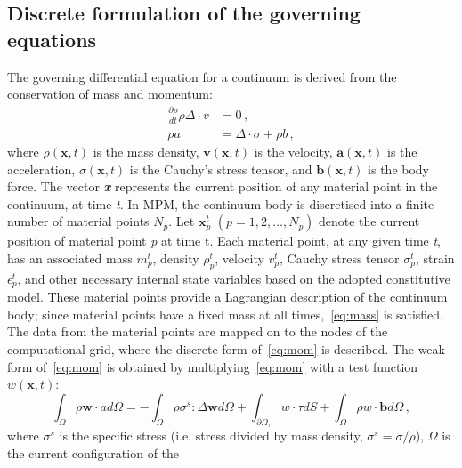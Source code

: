 \subsection{Discrete formulation of the governing equations}
The governing differential equation for a continuum is derived from the 
conservation of mass and momentum:
\begin{align}
\label{eq:mass}
\frac{\partial \rho}{dt}\rho \Delta \cdot \mathbf{\mathit{v}} & = 0 \,, \\   
 \label{eq:mom}
 \rho a & = \Delta \cdot \sigma + \rho \mathbf{\mathit{b}} \,,
\end{align}
where $\rho (\mathbf{x},t)$ is the mass density, $\mathit{\mathbf{v}} 
(\mathbf{x},t)$ is the velocity,  $\mathit{\mathbf{a}} (\mathbf{x},t)$ is the 
acceleration,  $\sigma (\mathbf{x},t)$ is the Cauchy's stress tensor, and  
$\mathit{\mathbf{b}} (\mathbf{x},t)$ is the body force. The vector 
\textbf{\textit{x}} represents the current position of any material point in 
the continuum, at time \textit{t}. In MPM, the continuum body is discretised 
into a finite number of material points $\mathit{N}_{p}$. Let 
$\mathit{\mathbf{x}}_{p}^{t}$ $(\mathit{p}=1,2,\dots,\mathit{N}_{p})$ denote 
the current position of material point \textit{p} at time t.
Each material point, at any given time \textit{t}, has an associated mass 
$\mathit{m}_{p}^{t}$, density $\rho_{p}^{t}$, velocity 
$\mathbf{\mathit{v}}_{p}^{t}$, Cauchy stress tensor $\sigma_{p}^{t}$, strain 
$\epsilon_{p}^{t}$, and other necessary internal state variables based on the 
adopted constitutive model. These material points provide a Lagrangian 
description of the continuum body; since material points have a fixed mass at 
all times,~\cref{eq:mass} is satisfied. The data from the material points 
are mapped on to the nodes of the computational grid, where the discrete form 
of~\cref{eq:mom} is described. The weak form of~\cref{eq:mom} is 
obtained 
by multiplying~\cref{eq:mom} with a test function 
$\mathbf{\mathit{w}}(\mathbf{x},t)$:
\begin{equation}
\int_{\Omega}\rho \mathit{\mathbf{w}} \cdot \mathbf{\mathit{a}} 
\mathit{d}\Omega = - \int_{\Omega} \rho {\sigma}^{s} : \Delta 
\mathit{\mathbf{w}} \mathit{d}\Omega + \int_{{\partial \Omega}_{\tau}} 
\mathbf{\mathit{w}} \cdot \tau \mathit{d} \mathit{S} + \int_{\Omega}\rho 
\mathbf{\mathit{w}} \cdot \mathbf{b} \mathit{d} \Omega \,,
\label{eq:weak}
\end{equation}
where $\sigma^{s}$ is the specific stress (i.e. stress divided by mass density, 
$\sigma^{s} = \sigma / \rho$), $\Omega$ is the current configuration of the 
